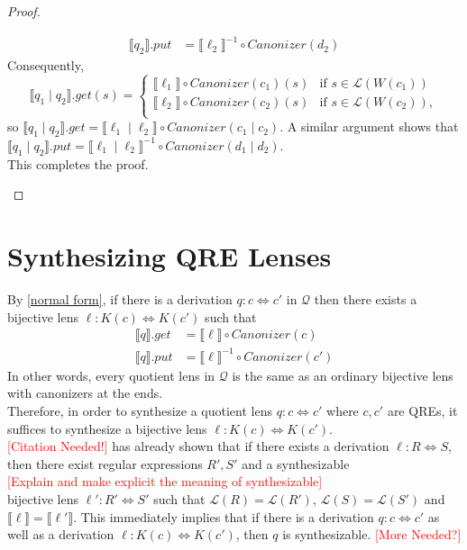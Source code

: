 \documentclass{svproc}
\newcommand{\sep}{\ensuremath{\; | \;}}
\newcommand{\canonizer}{\ensuremath{\mathit{Canonizer}}}
\begin{document}
\begin{proof}
\begin{enumerate}
\begin{align*}
\llbracket q_2 \rrbracket.put &= {\llbracket \ell_2 \rrbracket}^{-1} \circ
\canonizer(d_2)
\end{align*}
Consequently,
$$
  \llbracket q_1 \sep q_2 \rrbracket.get(s) = 
  \begin{cases}
  \llbracket \ell_1 \rrbracket \circ
\canonizer(c_1) (s) & \text{if } s \in \mathcal{L}(W(c_1))\\
  \llbracket \ell_2 \rrbracket \circ
\canonizer(c_2) (s) & \text{if } s \in \mathcal{L}(W(c_2)),\\
  \end{cases}$$
  so $\llbracket q_1 \sep q_2 \rrbracket.get = \llbracket \ell_1 \sep
  \ell_2 \rrbracket \circ \canonizer(c_1 \sep c_2)$. A similar argument shows
  that $\llbracket q_1 \sep q_2 \rrbracket.put = \llbracket \ell_1 \sep
  \ell_2 \rrbracket^{-1} \circ \canonizer(d_1 \sep d_2)$.\\
  This completes the proof.
\end{enumerate}
\end{proof}

\section{Synthesizing QRE Lenses}
\label{synth}

By \cref{normal form}, if there is a derivation $q : c \Leftrightarrow c'$ in
$\mathcal{Q}$ then there exists a bijective lens $\ell : K(c) \Leftrightarrow
K(c')$ such that
\begin{align*}
\llbracket q \rrbracket.get &= \llbracket \ell \rrbracket\circ \canonizer(c)\\
\llbracket q \rrbracket.put &= \llbracket \ell \rrbracket^{-1} \circ
\canonizer(c')
\end{align*}
In other words, every quotient lens in $\mathcal{Q}$ is the same as an ordinary
bijective lens with canonizers at the ends.\\
Therefore, in order to synthesize a quotient lens $q: c \Leftrightarrow c'$
where $c, c'$ are QREs, it suffices to synthesize a bijective lens $\ell : K(c)
\Leftrightarrow K(c')$.\\
\textcolor{red}{[Citation Needed!]} has already shown that if there
exists a derivation $\ell : R \Leftrightarrow S$, then there exist
regular expressions $R', S'$ and a synthesizable \\
\textcolor{red}{[Explain and make explicit the meaning
of synthesizable]} \\
bijective lens $\ell' :
R' \Leftrightarrow S'$ such that $\mathcal{L}(R) = \mathcal{L}(R')$,
$\mathcal{L}(S) = \mathcal{L}(S')$ and $\llbracket \ell \rrbracket =
\llbracket \ell' \rrbracket$. This immediately implies that if there is a
derivation $q : c \Leftrightarrow c'$ as well as a derivation $\ell : K(c)
\Leftrightarrow K(c')$, then $q$ is synthesizable.
\textcolor{red}{[More Needed?]}
\end{document}

